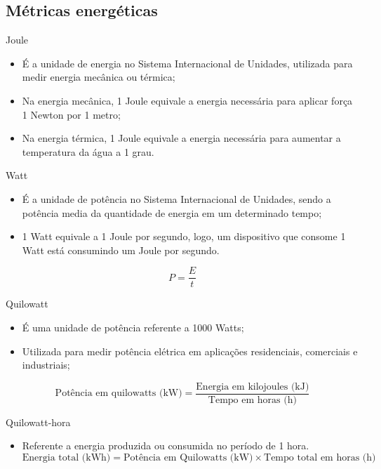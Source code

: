 \subsection{Métricas energéticas}

\begin{frame}{Joule}
    \begin{itemize}
        \item É a unidade de energia no Sistema Internacional de Unidades, utilizada para medir energia mecânica ou térmica;
        \item Na energia mecânica, 1 Joule equivale a energia necessária para aplicar força 1 Newton por 1 metro;
        \item Na energia térmica, 1 Joule equivale a energia necessária para aumentar a temperatura da água a 1 grau.
    \end{itemize}

\end{frame}

\begin{frame}{Watt}
    \begin{itemize}
        \item É a unidade de potência no Sistema Internacional de Unidades, sendo a potência media da quantidade de energia em um determinado tempo;
        \item 1 Watt equivale a 1 Joule por segundo, logo, um dispositivo que consome 1 Watt está consumindo um Joule por segundo.
    \end{itemize}
    \begin{equation}
        P = \frac{E}{t}
    \end{equation}
\end{frame}

\begin{frame}{Quilowatt}
    \begin{itemize}
        \item É uma unidade de potência referente a 1000 Watts;
        \item Utilizada para medir potência elétrica em aplicações residenciais, comerciais e industriais;
    \end{itemize}
    \begin{equation}
        \text{Potência em quilowatts (kW)} = \frac{\text{Energia em kilojoules (kJ)}}{\text{Tempo em horas (h)}}
        \end{equation}
\end{frame}

\begin{frame}{Quilowatt-hora}
    \begin{itemize}
        \item Referente a energia produzida ou consumida no período de 1 hora.
        \begin{equation}
            \text{Energia total (kWh)} = \text{Potência em Quilowatts (kW)} \times \text{Tempo total em horas (h)}
            \end{equation}
    \end{itemize}
\end{frame}


